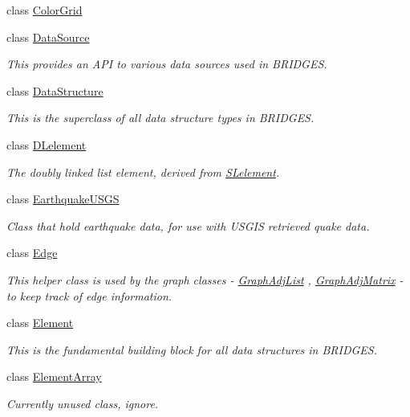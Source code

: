 \begin{DoxyCompactItemize}
class \mbox{\hyperlink{classbridges_1_1_color_grid}{Color\+Grid}}
\item 
class \mbox{\hyperlink{classbridges_1_1_data_source}{Data\+Source}}
\begin{DoxyCompactList}\small\item\em This provides an A\+PI to various data sources used in B\+R\+I\+D\+G\+ES. \end{DoxyCompactList}\item 
class \mbox{\hyperlink{classbridges_1_1_data_structure}{Data\+Structure}}
\begin{DoxyCompactList}\small\item\em This is the superclass of all data structure types in B\+R\+I\+D\+G\+ES. \end{DoxyCompactList}\item 
class \mbox{\hyperlink{classbridges_1_1_d_lelement}{D\+Lelement}}
\begin{DoxyCompactList}\small\item\em The doubly linked list element, derived from \mbox{\hyperlink{classbridges_1_1_s_lelement}{S\+Lelement}}. \end{DoxyCompactList}\item 
class \mbox{\hyperlink{classbridges_1_1_earthquake_u_s_g_s}{Earthquake\+U\+S\+GS}}
\begin{DoxyCompactList}\small\item\em Class that hold earthquake data, for use with U\+S\+G\+IS retrieved quake data. \end{DoxyCompactList}\item 
class \mbox{\hyperlink{classbridges_1_1_edge}{Edge}}
\begin{DoxyCompactList}\small\item\em This helper class is used by the graph classes -\/ \mbox{\hyperlink{classbridges_1_1_graph_adj_list}{Graph\+Adj\+List}} , \mbox{\hyperlink{classbridges_1_1_graph_adj_matrix}{Graph\+Adj\+Matrix}} -\/ to keep track of edge information. \end{DoxyCompactList}\item 
class \mbox{\hyperlink{classbridges_1_1_element}{Element}}
\begin{DoxyCompactList}\small\item\em This is the fundamental building block for all data structures in B\+R\+I\+D\+G\+ES. \end{DoxyCompactList}\item 
class \mbox{\hyperlink{classbridges_1_1_element_array}{Element\+Array}}
\begin{DoxyCompactList}\small\item\em Currently unused class, ignore. \end{DoxyCompactList}\item 

\end{DoxyCompactItemize}
